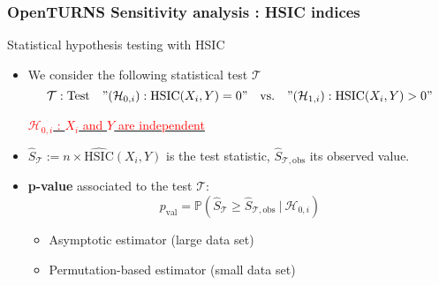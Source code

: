 \documentclass{beamer}
\begin{document}
\begin{frame}
\frametitle{OpenTURNS Sensitivity analysis : HSIC indices}

\small

\begin{block}{Statistical hypothesis testing with HSIC}
\begin{itemize}
\item We consider the following statistical test $\mathcal{T}$
\small
\begin{equation*}
\mathcal{T}: \textrm{Test}\quad "(\mathcal{H}_{0,i}):\mathrm{HSIC}(X_i,Y) = 0"\quad\textrm{vs.}\quad "(\mathcal{H}_{1,i}):\mathrm{HSIC}(X_i,Y) > 0"
\end{equation*}

\underline{\textcolor{red}{$\mathcal{H}_{0,i}$ : $X_i$ and $Y$ are independent}}

\normalsize
\item  $\widehat{S}_{\mathcal{T}} := n \times \widehat{\mathrm{HSIC}}(X_i,Y)$ is the test statistic, $\widehat{S}_{\mathcal{T},\textrm{obs}}$ its observed value.

\item \textbf{p-value} associated to the test $\mathcal{T}$:
\begin{equation*}
p_{\textrm{val}} = \mathbb{P}\left(\widehat{S}_{\mathcal{T}} \geq \widehat{S}_{\mathcal{T},\textrm{obs}}~|~\mathcal{H}_{0,i}\right)
\end{equation*}
\vspace{-10pt}
\begin{itemize}
\item Asymptotic estimator (large data set)
\item Permutation-based estimator (small data set)
\end{itemize}
\end{itemize}
\end{block}

\end{frame}
  
  
  
  
\end{document}
